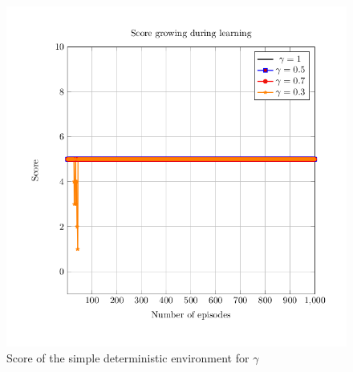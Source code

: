 \documentclass[conference]{IEEEtran}
\begin{document}

\begin{figure}
\includegraphics[scale = 0.3]{images/Gamma.png}
\caption{Score of the simple deterministic environment for $\gamma$}
\end{figure}
\end{document}
